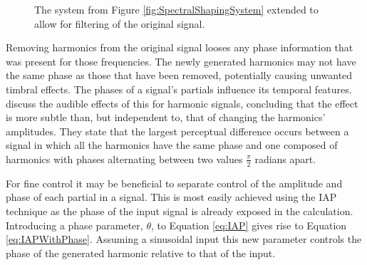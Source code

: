 \begin{figure}[h!]
			\caption{The system from Figure \ref{fig:SpectralShapingSystem} extended to allow for filtering of
				 the original signal.}
			\label{fig:SuperpositionSystem}
		\end{figure}

		Removing harmonics from the original signal looses any phase information that was present for those
		frequencies. The newly generated harmonics may not have the same phase as those that have been removed,
		potentially causing unwanted timbral effects. The phases of a signal's partials influence its temporal
		features. \citet{plomp1969effect} discuss the audible effects of this for harmonic signals, concluding that
		the effect is more subtle than, but independent to, that of changing the harmonics' amplitudes. They state
		that the largest perceptual difference occurs between a signal in which all the harmonics have the same
		phase and one composed of harmonics with phases alternating between two values $\frac{\pi}{2}$ radians
		apart.

		For fine control it may be beneficial to separate control of the amplitude and phase of each partial in a
		signal. This is most easily achieved using the IAP technique as the phase of the input signal is already
		exposed in the calculation. Introducing a phase parameter, $\theta$, to Equation \ref{eq:IAP} gives rise to
		Equation \ref{eq:IAPWithPhase}. Assuming a sinusoidal input this new parameter controls the phase of the
		generated harmonic relative to that of the input. 

